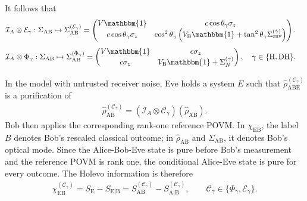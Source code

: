 \documentclass[%
final, 
superscriptaddress,
 amsmath,amssymb,amsfonts,
 aps,
 pra,
 longbibliography,
]{revtex4-2}
\newcommand{\ind}[1]{\mathrm{#1}}
\begin{document}
It follows that
\begin{align}
    \label{eq:psi_action}
    &\mathcal{I}_A\otimes \mathcal{E}_{\gamma}:
    \Sigma_{\ind{AB}}\mapsto
     \Sigma_{\ind{AB}}^{(\mathcal{E}_{\gamma})}
     =\begin{pmatrix}
        V\mathbbm{1}
        &
        c\cos\theta_{\gamma}\sigma_z
        \\
        c\cos\theta_{\gamma}\sigma_z
        &
        \cos^2\theta_{\gamma}
        \left(
          V_{\ind{B}}\mathbbm{1}
          +
          \tan^2\theta_{\gamma}
          \Sigma_{\ind{env}}^{(\gamma)}
        \right)
    \end{pmatrix}.
\end{align}
\begin{align}
  &
  \label{eq:sigma_m_cov}
\mathcal{I}_A\otimes \Phi_{\gamma}:
  \Sigma_{\ind{AB}}\mapsto
  \Sigma_{\ind{AB}}^{(\Phi_{\gamma})}
  =\begin{pmatrix}
    V\mathbbm{1}&c\sigma_z\\
    c\sigma_z&V_{\ind{B}}\mathbbm{1}+\Sigma_N^{(\gamma)}
\end{pmatrix},\quad \gamma\in\{\ind{H},\ind{DH}\}.
\end{align}

In the model with untrusted receiver noise, Eve holds a system $E$ such that
$\hat{\rho}_{\ind{ABE}}^{\left(\mathcal{C}_{\gamma}\right)}$
is a purification of
\begin{align}
  \hat{\rho}_{\ind{AB}}^{\left(\mathcal{C}_{\gamma}\right)}
  =
  (\mathcal{I}_A\otimes\mathcal{C}_{\gamma})
  (\hat{\rho}_{\ind{AB}}).
\end{align}
Bob then applies the corresponding rank-one reference POVM. In
$\chi_{\ind{EB}}$, the label $B$ denotes Bob's rescaled classical outcome; in
$\hat{\rho}_{\ind{AB}}$ and $\Sigma_{\ind{AB}}$, it denotes Bob's optical mode.
Since the Alice-Bob-Eve state is pure before Bob's measurement and the reference POVM is rank one, the conditional Alice-Eve state is pure for every outcome. The Holevo information is therefore
\begin{align}
  \label{eq:chi}
  \chi_{\ind{EB}} ^{\left(\mathcal{C}_{\gamma}\right)}
    =
    S_{\ind{E}}
    -
    S_{\ind{E}|\ind{B}}
    =
    S_{\ind{AB}}^{\left(\mathcal{C}_{\gamma}\right)}
    -
    S_{\ind{A}|\ind{B}}^{\left(\mathcal{C}_{\gamma}\right)},
    \qquad
    \mathcal{C}_{\gamma}
    \in
    \{\Phi_{\gamma},\mathcal{E}_{\gamma}\}.
\end{align}
\end{document}
